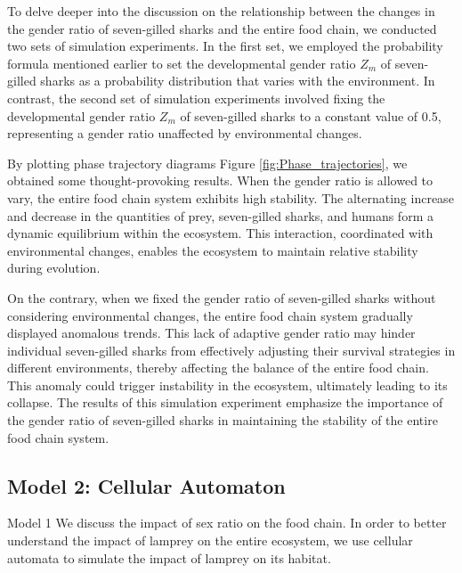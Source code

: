 \documentclass[CTeX = true]{mcmthesis}  %
\begin{document}


To delve deeper into the discussion on the relationship between the changes in the gender ratio of seven-gilled sharks and the entire food chain, we conducted two sets of simulation experiments. In the first set, we employed the probability formula mentioned earlier to set the developmental gender ratio $Z_m$ of seven-gilled sharks as a probability distribution that varies with the environment. In contrast, the second set of simulation experiments involved fixing the developmental gender ratio $Z_m$ of seven-gilled sharks to a constant value of 0.5, representing a gender ratio unaffected by environmental changes.

By plotting phase trajectory diagrams Figure \ref{fig:Phase_trajectories}, we obtained some thought-provoking results. When the gender ratio is allowed to vary, the entire food chain system exhibits high stability. The alternating increase and decrease in the quantities of prey, seven-gilled sharks, and humans form a dynamic equilibrium within the ecosystem. This interaction, coordinated with environmental changes, enables the ecosystem to maintain relative stability during evolution.

On the contrary, when we fixed the gender ratio of seven-gilled sharks without considering environmental changes, the entire food chain system gradually displayed anomalous trends. This lack of adaptive gender ratio may hinder individual seven-gilled sharks from effectively adjusting their survival strategies in different environments, thereby affecting the balance of the entire food chain. This anomaly could trigger instability in the ecosystem, ultimately leading to its collapse. The results of this simulation experiment emphasize the importance of the gender ratio of seven-gilled sharks in maintaining the stability of the entire food chain system.

\subsection{Model 2: Cellular Automaton}
Model 1 We discuss the impact of sex ratio on the food chain. In order to better understand the impact of lamprey on the entire ecosystem, we use cellular automata to simulate the impact of lamprey on its habitat.
\end{document}

